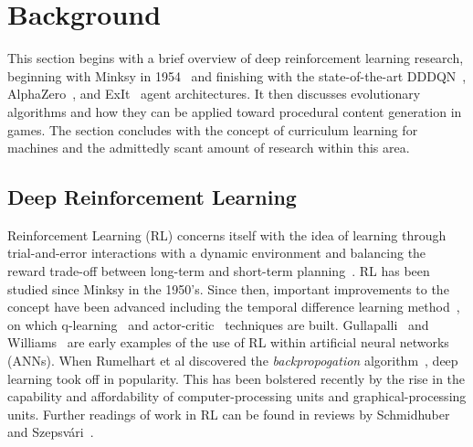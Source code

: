 \documentclass[letterpaper]{article} %
\begin{document}
\section{Background}\label{sec:background}
This section begins with a brief overview of deep reinforcement learning research, beginning with Minksy in 1954~\cite{minsky1954theory} and finishing with the state-of-the-art DDDQN~\cite{wang2016dueling}, AlphaZero~\cite{silver2017mastering,silver2017masteringchess}, and ExIt~\cite{anthony2017thinking} agent architectures. It then discusses evolutionary algorithms and how they can be applied toward procedural content generation in games. The section concludes with the concept of curriculum learning for machines and the admittedly scant amount of research within this area.

\subsection{Deep Reinforcement Learning}
Reinforcement Learning (RL) concerns itself with the idea of learning through trial-and-error interactions with a dynamic environment and balancing the reward trade-off between long-term and short-term planning~\cite{sutton1998introduction}.
RL has been studied since Minksy \cite{minsky1954theory} in the 1950's.
Since then, important improvements to the concept have been advanced including the temporal difference learning method~\cite{sutton1984temporal,sutton1988learning}, on which q-learning~\cite{watkins1992q} and actor-critic~\cite{barto1983neuronlike} techniques are built.
Gullapalli~\cite{gullapalli1990stochastic} and Williams~\cite{williams1992simple} are early examples of the use of RL within artificial neural networks (ANNs).
When Rumelhart et al discovered the \emph{backpropogation}
algorithm~\cite{rumelhart1986learning}, deep learning took off in popularity. This has been bolstered recently by the rise in the capability and affordability of computer-processing units and graphical-processing units.
Further readings of work in RL can be found in reviews by Schmidhuber~\cite{schmidhuber2015deep} and Szepsv\'ari~\cite{szepesvari2010algorithms}.
\end{document}
